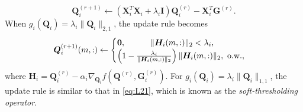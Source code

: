 \documentclass[10pt,journal]{IEEEtran}
\newcommand{\G}{\boldsymbol{G}}
\newcommand{\Q}{\boldsymbol{Q}}
\newcommand{\X}{\boldsymbol{X}}
\begin{document}
\begin{equation}\label{eq:L2}
\Q_i^{(r+1)} \leftarrow ({\bm X}_i^T{\bm X}_i+\lambda_i\bm I){\bm Q}_i^{(r)}- {\bm X}_i^T{\bm G}^{(r)}.
\end{equation} 
When $g_i(\Q_i)=\lambda_i\|\Q_i\|_{2,1}$, the update rule becomes
\begin{equation}\label{eq:L21}
\Q_i^{(r+1)}(m,:) \leftarrow \begin{cases}
\bm 0, \quad \quad\quad\|\bm H_i(m,:)\|_2 < \lambda_i,\\
\left(1 - \frac{\lambda_i}{\|\bm H_i(m,:)\|_2}\right)\|\bm H_i(m,:)\|_2,~{\rm o.w.},
\end{cases}
\end{equation}
where $\bm H_i =\Q_i^{(r)}-\alpha_i \nabla_{\Q_i} f\left(\Q^{(r)},\G_i^{(r)}\right)$.
For $g_i(\Q_i)=\lambda_i\|\Q_i\|_{1,1}$, the update rule is similar to that in \eqref{eq:L21},
which is known as the \emph{soft-thresholding operator}.
\end{document}
